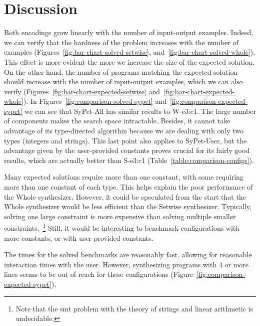 \section{Discussion}
\label{sec:discussion}

Both encodings grow linearly with the number of input-output examples.
Indeed, we can verify that the hardness of the problem increases with the number
of examples (Figures~\ref{fig:bar-chart-solved-setwise},
and~\ref{fig:bar-chart-solved-whole}).
This effect is more evident the more we increase the size of the expected
solution.
On the other hand, the number of programs matching the expected solution should
increase with the number of input-output examples, which we can also verify
(Figures~\ref{fig:bar-chart-expected-setwise}
and~\ref{fig:bar-chart-expected-whole}).
In Figures~\ref{fig:comparison-solved-sypet}
and~\ref{fig:comparison-expected-sypet} we can see that SyPet-All has similar
results to W-e3:c1.
The large number of components makes the search space intractable.
Besides, it cannot take advantage of its type-directed algorithm because we are
dealing with only two types (integers and strings).
This last point also applies to SyPet-User, but the advantage given by the
user-provided constants proves crucial for its fairly good results, which are
actually better than S-e3:c1 (Table~\ref{table:comparison-configs}).

Many expected solutions require more than one constant, with some requiring more
than one constant of each type.
This helps explain the poor performance of the Whole synthesizer.
However, it could be speculated from the start that the Whole synthesizer would
be less efficient than the Setwise synthesizer.
Typically, solving one large constraint is more expensive than solving multiple
smaller constraints.~\footnote{Note that the \gls{smt} problem with the theory
of strings and linear arithmetic is undecidable.}
Still, it would be interesting to benchmark configurations with more
constants, or with user-provided constants.


The times for the solved benchmarks are reasonably fast, allowing for reasonable
interaction times with the user.
However, synthesizing programs with 4 or more lines seems to be out of reach for
these configurations (Figure~\ref{fig:comparison-expected-sypet}).
